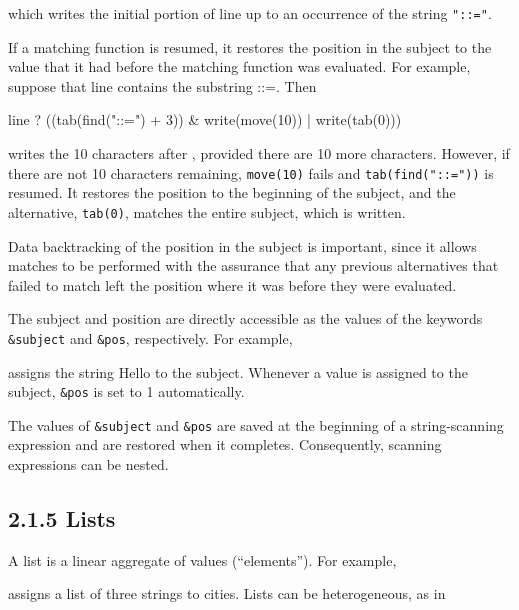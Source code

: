 \noindent which writes the initial portion of line up to an occurrence
of the string \texttt{"::="}.

If a matching function is resumed, it restores the position in the
subject to the value that it had before the matching function was
evaluated. For example, suppose that line contains the substring
{\textquotedbl}::={\textquotedbl}. Then

\begin{iconcode}
\>line ? ((tab(find("::=") + 3)) \& write(move(10)) | write(tab(0)))
\end{iconcode}

\noindent writes the 10 characters after , provided there
are 10 more characters. However, if there are not 10 characters
remaining, \texttt{move(10)} fails and \texttt{tab(find("::="))} is
resumed. It restores the position to the beginning of the subject, and
the alternative, \texttt{tab(0)}, matches the entire subject, which is
written.

Data backtracking of the position in the subject is important, since
it allows matches to be performed with the assurance that any previous
alternatives that failed to match left the position where it was
before they were evaluated.

The subject and position are directly accessible as the values of the
keywords \texttt{\&subject} and \texttt{\&pos}, respectively. For example,


\noindent assigns the string {\textquotedbl}Hello{\textquotedbl} to
the subject. Whenever a value is assigned to the subject, \texttt{\&pos} is set
to 1 automatically.

The values of \texttt{\&subject} and \texttt{\&pos} are saved at the
beginning of a string-scanning expression and are restored when it
completes. Consequently, scanning expressions can be nested.


\subsection[2.1.5 Lists]{2.1.5 Lists}

A list is a linear aggregate of values (``elements''). For example,


\noindent
assigns a list of three strings to cities. Lists can be heterogeneous, as in


